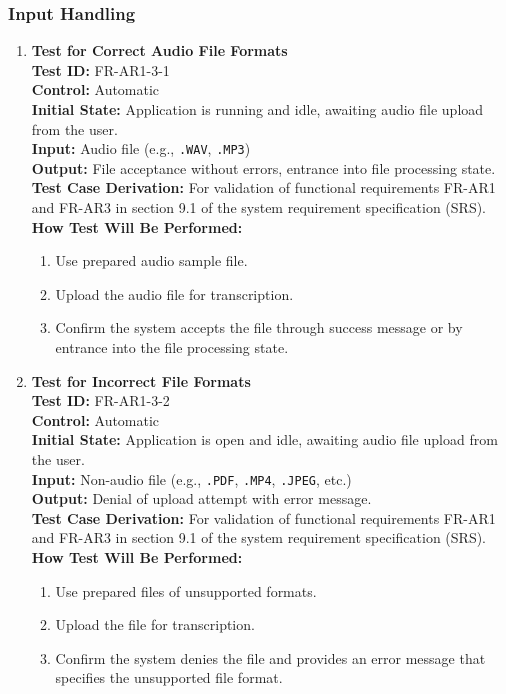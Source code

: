 \documentclass[12pt, titlepage]{article}
\begin{document}
  \subsubsection{Input Handling}
  \begin{enumerate}
    \item \textbf{Test for Correct Audio File Formats} \\
      \newline
      \textbf{Test ID:} FR-AR1-3-1 \\
      \textbf{Control:} Automatic \\
      \textbf{Initial State:} Application is running and idle, awaiting audio file upload from the user. \\
      \textbf{Input:} Audio file (e.g., \texttt{.WAV}, \texttt{.MP3}) \\
      \textbf{Output:} File acceptance without errors, entrance into file processing state. \\
      \textbf{Test Case Derivation:} For validation of functional requirements FR-AR1 and FR-AR3 in section 9.1 of the system requirement specification (SRS).\\
      \textbf{How Test Will Be Performed:}
      \begin{enumerate}
          \item Use prepared audio sample file.
          \item Upload the audio file for transcription.
          \item Confirm the system accepts the file through success message or by entrance into the file processing state.
      \end{enumerate}
  
  \item \textbf{Test for Incorrect File Formats} \\
    \newline
    \textbf{Test ID:} FR-AR1-3-2 \\
    \textbf{Control:} Automatic \\
    \textbf{Initial State:} Application is open and idle, awaiting audio file upload from the user. \\
    \textbf{Input:} Non-audio file (e.g., \texttt{.PDF}, \texttt{.MP4}, \texttt{.JPEG}, etc.) \\
    \textbf{Output:} Denial of upload attempt with error message. \\
    \textbf{Test Case Derivation:} For validation of functional requirements FR-AR1 and FR-AR3 in section 9.1 of the system requirement specification (SRS). \\
    \textbf{How Test Will Be Performed:}
    \begin{enumerate}
        \item Use prepared files of unsupported formats.
        \item Upload the file for transcription.
        \item Confirm the system denies the file and provides an error message that specifies the unsupported file format.
    \end{enumerate}
  

\end{enumerate}
\end{document}
